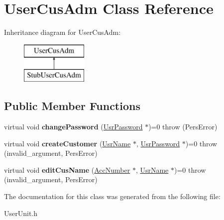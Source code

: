 \hypertarget{classUserCusAdm}{\section{User\-Cus\-Adm Class Reference}
\label{d1/d48/classUserCusAdm}
}
Inheritance diagram for User\-Cus\-Adm\-:\begin{figure}[H]
\begin{center}
\leavevmode
\includegraphics[height=2.000000cm]{d1/d48/classUserCusAdm}
\end{center}
\end{figure}
\subsection*{Public Member Functions}
\begin{DoxyCompactItemize}
\item 
\hypertarget{classUserCusAdm_aa78ba1b0eb4f14ca68f8ef2318e9c3d1}{virtual void {\bfseries change\-Password} (\hyperlink{classUsrPassword}{Usr\-Password} $\ast$)=0  throw (\-Pers\-Error)}\label{d1/d48/classUserCusAdm_aa78ba1b0eb4f14ca68f8ef2318e9c3d1}

\item 
\hypertarget{classUserCusAdm_afc190444ef3834236b8057bc876ee106}{virtual void {\bfseries create\-Customer} (\hyperlink{classUsrName}{Usr\-Name} $\ast$, \hyperlink{classUsrPassword}{Usr\-Password} $\ast$)=0  throw (invalid\-\_\-argument, Pers\-Error)}\label{d1/d48/classUserCusAdm_afc190444ef3834236b8057bc876ee106}

\item 
\hypertarget{classUserCusAdm_a6105bcc548efb475bae0bc36b58743a2}{virtual void {\bfseries edit\-Cus\-Name} (\hyperlink{classAccNumber}{Acc\-Number} $\ast$, \hyperlink{classUsrName}{Usr\-Name} $\ast$)=0  throw (invalid\-\_\-argument, Pers\-Error)}\label{d1/d48/classUserCusAdm_a6105bcc548efb475bae0bc36b58743a2}

\end{DoxyCompactItemize}


The documentation for this class was generated from the following file\-:\begin{DoxyCompactItemize}
\item 
User\-Unit.\-h\end{DoxyCompactItemize}
